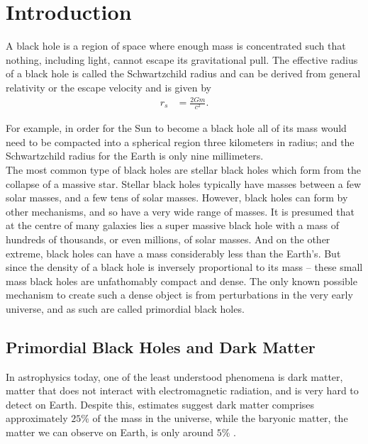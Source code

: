 %
%
%
%
%

\chapter{Introduction}
\label{chap:intro}

A black hole is a region of space where enough mass is concentrated such that nothing, including light, cannot escape its gravitational pull. The effective radius of a black hole is called the Schwartzchild radius and can be derived from general relativity or the escape velocity and is given by
\begin{align*}
r_s &= \frac{2Gm}{c^2}.
\end{align*}

For example, in order for the Sun to become a black hole all of its mass would need to be compacted into a spherical region three kilometers in radius; and the Schwartzchild radius for the Earth is only nine millimeters. \\

The most common type of black holes are stellar black holes which form from the collapse of a massive star. Stellar black holes typically have masses between a few solar masses, and a few tens of solar masses. However, black holes can form by other mechanisms, and so have a very wide range of masses. It is presumed that at the centre of many galaxies lies a super massive black hole with a mass of hundreds of thousands, or even millions, of solar masses. And on the other extreme, black holes can have a mass considerably less than the Earth's. But since the density of a black hole is inversely proportional to its mass -- these small mass black holes are unfathomably compact and dense. The only known possible mechanism to create such a dense object is from perturbations in the very early universe, and as such are called primordial black holes.

\section{Primordial Black Holes and Dark Matter}

In astrophysics today, one of the least understood phenomena is dark matter, matter that does not interact with electromagnetic radiation, and is very hard to detect on Earth. Despite this, estimates suggest dark matter comprises approximately $25\%$ of the mass in the universe, while the baryonic matter, the matter we can observe on Earth, is only around $5\%$ \cite{critdens, cosmology}. \\

